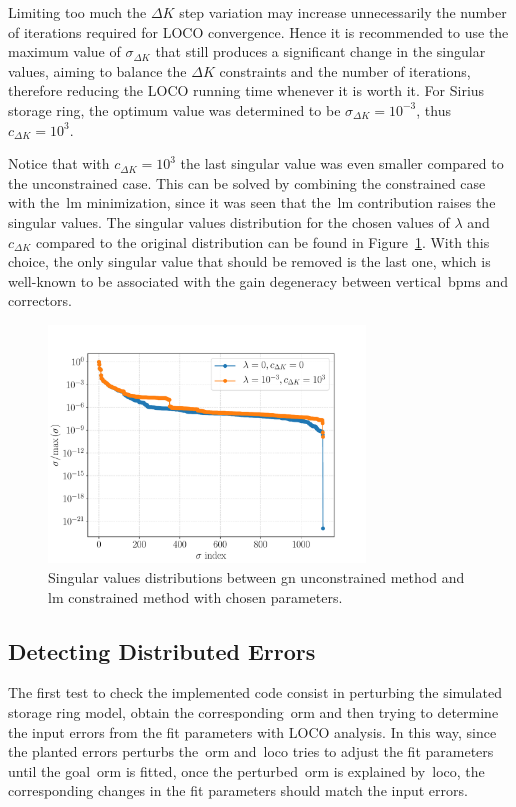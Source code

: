 Limiting too much the $\Delta K$ step variation may increase unnecessarily the number of iterations required for LOCO convergence. Hence it is recommended to use the maximum value of $\sigma_{\Delta K}$ that still produces a significant change in the singular values, aiming to balance the $\Delta K$ constraints and the number of iterations, therefore reducing the LOCO running time whenever it is worth it. For Sirius storage ring, the optimum value was determined to be $\sigma_{\Delta K} = 10^{-3}$, thus $c_{\Delta K} = 10^{3}$.

Notice that with $c_{\Delta K}=10^{3}$ the last singular value was even smaller compared to the unconstrained case. This can be solved by combining the constrained case with the~\gls{lm} minimization, since it was seen that the~\gls{lm} contribution raises the singular values. The singular values distribution for the chosen values of $\lambda$ and $c_{\Delta K}$ compared to the original distribution can be found in Figure~\ref{fig:compare_svs}. With this choice, the only singular value that should be removed is the last one, which is well-known to be associated with the gain degeneracy between vertical~\glspl{bpm} and correctors.
\begin{figure}
\centering
\includegraphics[width=0.75\textwidth]{figures/chosen_singular_values.pdf}
\caption{Singular values distributions between \gls{gn} unconstrained method and \gls{lm} constrained method with chosen parameters.}
\label{fig:compare_svs}
\end{figure}

\subsection{Detecting Distributed Errors}
The first test to check the implemented code consist in perturbing the simulated storage ring model, obtain the corresponding~\gls{orm} and then trying to determine the input errors from the fit parameters with LOCO analysis. In this way, since the planted errors perturbs the~\gls{orm} and~\gls{loco} tries to adjust the fit parameters until the goal~\gls{orm} is fitted, once the perturbed~\gls{orm} is explained by~\gls{loco}, the corresponding changes in the fit parameters should match the input errors. 

